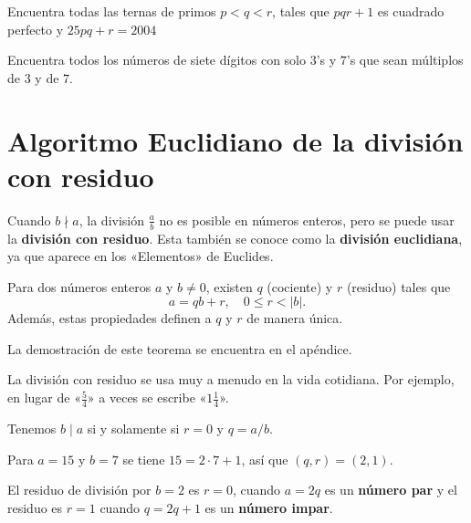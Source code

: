 \begin{problema}
Encuentra todas las ternas de primos $p<q<r$, tales que $pqr+1$ es cuadrado perfecto y $25pq+r=2004$
\end{problema}
\vspace{3cm}


\begin{problema}
Encuentra todos los números de siete dígitos con solo $3$'s y $7$'s que sean múltiplos de $3$ y de $7$.
\end{problema}

\section{Algoritmo Euclidiano de la división con residuo}


Cuando $b \nmid a$, la división $\frac{a}{b}$ no es posible en números enteros,
pero se puede usar la \textbf{división con residuo}. Esta también se conoce como
la \textbf{división euclidiana}, ya que aparece en los «Elementos» de Euclides.

\begin{proposicion}
  Para dos números enteros $a$ y $b \ne 0$, existen $q$ (cociente) y $r$
  (residuo) tales que
  \[ a = qb + r,
    \quad
    0 \le r < |b|. \]
  Además, estas propiedades definen a $q$ y $r$ de manera única.
\end{proposicion}

La demostración de este teorema se encuentra en el apéndice.

La división con residuo se usa muy a menudo en la vida cotidiana. Por ejemplo,
en lugar de «$\frac{5}{4}$» a veces se escribe «$1\frac{1}{4}$».

\begin{ejemplo}
  Tenemos $b \mid a$ si y solamente si $r = 0$ y $q = a/b$.
\end{ejemplo}

\begin{ejemplo}
  Para $a = 15$ y $b = 7$ se tiene $15 = 2\cdot 7 + 1$, así que $(q,r) = (2,1)$.
\end{ejemplo}

\begin{ejemplo}
  El residuo de división por $b = 2$ es $r = 0$, cuando $a = 2q$ es un
  \textbf{número par} y el residuo es $r = 1$ cuando $q = 2q+1$ es un
  \textbf{número impar}.
\end{ejemplo}

